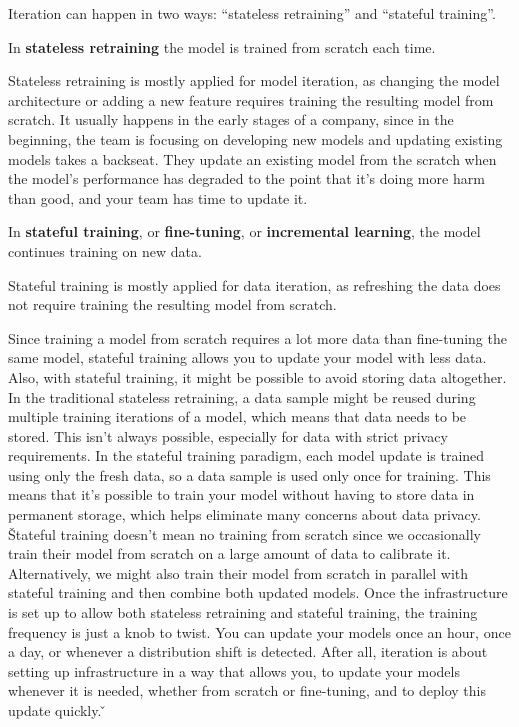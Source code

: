 Iteration can happen in two ways: ``stateless retraining'' and ``stateful training''.

In \textbf{stateless retraining} the model is trained from scratch each time.
\ed

Stateless retraining is mostly applied for model iteration, as changing the model architecture or adding a new
feature requires training the resulting model from scratch. It usually happens in the early stages of a company,
since in the beginning, the team is focusing on developing new models and updating existing models takes a backseat.
They update an existing model from the scratch when the model's performance has degraded to the point that it's doing
more harm than good, and your team has time to update it.

In \textbf{stateful training}, or \textbf{fine-tuning}, or \textbf{incremental learning}, the model continues training
on new data.
\ed

Stateful training is mostly applied for data iteration, as refreshing the data does not require training the resulting
model from scratch.


Since training a model from scratch requires a lot more data than fine-tuning the same model, stateful training
allows you to update your model with less data. Also, with stateful training, it might be possible to avoid storing
data altogether. In the traditional stateless retraining, a data sample might be reused during multiple training
iterations of a model, which means that data needs to be stored. This isn't always possible, especially for data with
strict privacy requirements. In the stateful training paradigm, each model update is trained using only the fresh
data, so a data sample is used only once for training. This means that it's possible to train your model without
having to store data in permanent storage, which helps eliminate many concerns about data privacy. \v

Stateful training doesn't mean no training from scratch since we occasionally train their model from scratch on a
large amount of data to calibrate it. Alternatively, we might also train their model from scratch in parallel with
stateful training and then combine both updated models. Once the infrastructure is set up to allow both stateless
retraining and stateful training, the training frequency is just a knob to twist. You can update your models once an
hour, once a day, or whenever a distribution shift is detected. After all, iteration is about setting up
infrastructure in a way that allows you, to update your models whenever it is needed, whether from scratch or
fine-tuning, and to deploy this update quickly. \v


